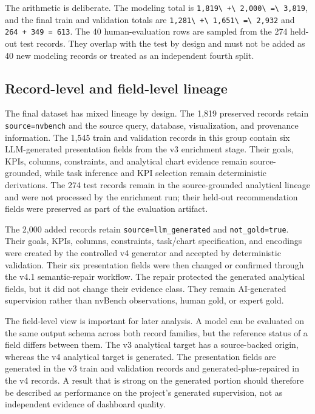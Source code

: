 The arithmetic is deliberate. The modeling total is \nolinkurl{1,819\ +\ 2,000\ =\ 3,819}, and the final train and validation totals are \nolinkurl{1,281\ +\ 1,651\ =\ 2,932} and \texttt{264\ +\ 349\ =\ 613}. The 40 human-evaluation rows are sampled from the 274 held-out test records. They overlap with the test by design and must not be added as 40 new modeling records or treated as an independent fourth split.

\subsection{Record-level and field-level lineage}

The final dataset has mixed lineage by design. The 1,819 preserved records retain \texttt{source=nvbench} and the source query, database, visualization, and provenance information. The 1,545 train and validation records in this group contain six LLM-generated presentation fields from the v3 enrichment stage. Their goals, KPIs, columns, constraints, and analytical chart evidence remain source-grounded, while task inference and KPI selection remain deterministic derivations. The 274 test records remain in the source-grounded analytical lineage and were not processed by the enrichment run; their held-out recommendation fields were preserved as part of the evaluation artifact.

The 2,000 added records retain \texttt{source=llm\_generated} and \texttt{not\_gold=true}. Their goals, KPIs, columns, constraints, task/chart specification, and encodings were created by the controlled v4 generator and accepted by deterministic validation. Their six presentation fields were then changed or confirmed through the v4.1 semantic-repair workflow. The repair protected the generated analytical fields, but it did not change their evidence class. They remain AI-generated supervision rather than nvBench observations, human gold, or expert gold.

The field-level view is important for later analysis. A model can be evaluated on the same output schema across both record families, but the reference status of a field differs between them. The v3 analytical target has a source-backed origin, whereas the v4 analytical target is generated. The presentation fields are generated in the v3 train and validation records and generated-plus-repaired in the v4 records. A result that is strong on the generated portion should therefore be described as performance on the project's generated supervision, not as independent evidence of dashboard quality.

